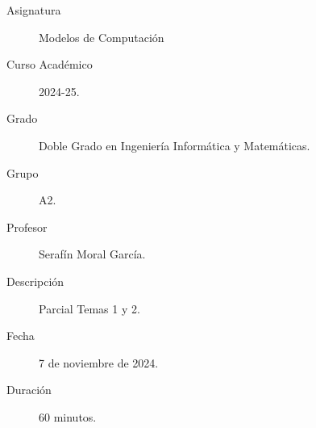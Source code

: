 \documentclass[12pt]{article}
\begin{document}

    
    

    \begin{description}
        \item[Asignatura] Modelos de Computación
        \item[Curso Académico] 2024-25.
        \item[Grado] Doble Grado en Ingeniería Informática y Matemáticas.
        \item[Grupo] A2.
        \item[Profesor] Serafín Moral García.
        \item[Descripción] Parcial Temas 1 y 2.
        \item[Fecha] 7 de noviembre de 2024.
        \item[Duración] 60 minutos.    
    \end{description}
    \newpage
\end{document}
